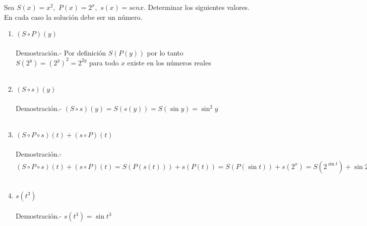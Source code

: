 \begin{ej}
Sea $S(x)=x^2,$ $P(x)=2^x ,$ $s(x)=sen x$. Determinar los siguientes valores. En cada caso la solución debe ser un número.
\begin{enumerate}[\bfseries 1)]
\item $(S \circ P)(y)$\\\\
Demostración.- \; Por definición $S(P(y))$ por lo tanto $S(2^y) = (2^y)^2 = 2^{2y}$ para todo $x$ existe en los números reales\\\\

\item $(S \circ s)(y)$ \\\\
Demostración.- \; $(S \circ s)(y) = S(s(y)) = S(\sin y) = \sin^2 y$\\\\

\item $(S \circ P \circ s)(t) + (s \circ P)(t)$\\\\
Demostración.- \; $(S \circ P \circ s)(t) + (s \circ P)(t) = S(P(s(t))) + s(P(t)) = S(P(\sin t)) + s(2^x) = S(2^{\sin t}) + \sin 2^{t} = \left( 2^{sin t} \right)^2 + \sin 2^{t} = 2^{2 \sin t}+ \sin 2^t$\\\\

\item $s(t^3)$\\\\
Demostración.- \; $s(t^3) = \sin t^3$\\\\ 
\end{enumerate}
\end{ej}

